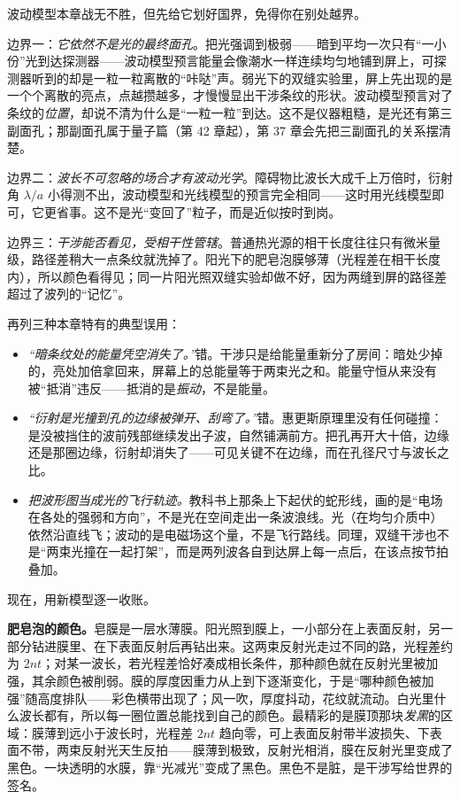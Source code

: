 
\begin{mainline}
波动模型本章战无不胜，但先给它划好国界，免得你在别处越界。

边界一：\emph{它依然不是光的最终面孔}。把光强调到极弱——暗到平均一次只有“一小份”光到达探测器——波动模型预言能量会像潮水一样连续均匀地铺到屏上，可探测器听到的却是一粒一粒离散的“咔哒”声。弱光下的双缝实验里，屏上先出现的是一个个离散的亮点，点越攒越多，才慢慢显出干涉条纹的形状。波动模型预言对了条纹的\emph{位置}，却说不清为什么是“一粒一粒”到达。这不是仪器粗糙，是光还有第三副面孔；那副面孔属于量子篇（第 42 章起），第 37 章会先把三副面孔的关系摆清楚。

边界二：\emph{波长不可忽略的场合才有波动光学}。障碍物比波长大成千上万倍时，衍射角 \(\lambda/a\) 小得测不出，波动模型和光线模型的预言完全相同——这时用光线模型即可，它更省事。这不是光“变回了”粒子，而是近似按时到岗。

边界三：\emph{干涉能否看见，受相干性管辖}。普通热光源的相干长度往往只有微米量级，路径差稍大一点条纹就洗掉了。阳光下的肥皂泡膜够薄（光程差在相干长度内），所以颜色看得见；同一片阳光照双缝实验却做不好，因为两缝到屏的路径差超过了波列的“记忆”。
\end{mainline}

再列三种本章特有的典型误用：

\begin{itemize}[leftmargin=1.8em]
  \item \emph{“暗条纹处的能量凭空消失了。”}错。干涉只是给能量重新分了房间：暗处少掉的，亮处加倍拿回来，屏幕上的总能量等于两束光之和。能量守恒从来没有被“抵消”违反——抵消的是\emph{振动}，不是能量。
  \item \emph{“衍射是光撞到孔的边缘被弹开、刮弯了。”}错。惠更斯原理里没有任何碰撞：是没被挡住的波前残部继续发出子波，自然铺满前方。把孔再开大十倍，边缘还是那圈边缘，衍射却消失了——可见关键不在边缘，而在孔径尺寸与波长之比。
  \item \emph{把波形图当成光的飞行轨迹。}教科书上那条上下起伏的蛇形线，画的是“电场在各处的强弱和方向”，不是光在空间走出一条波浪线。光（在均匀介质中）依然沿直线飞；波动的是电磁场这个量，不是飞行路线。同理，双缝干涉也不是“两束光撞在一起打架”，而是两列波各自到达屏上每一点后，在该点按节拍叠加。
\end{itemize}


现在，用新模型逐一收账。

\textbf{肥皂泡的颜色。}皂膜是一层水薄膜。阳光照到膜上，一小部分在上表面反射，另一部分钻进膜里、在下表面反射后再钻出来。这两束反射光走过不同的路，光程差约为 \(2nt\)；对某一波长，若光程差恰好凑成相长条件，那种颜色就在反射光里被加强，其余颜色被削弱。膜的厚度因重力从上到下逐渐变化，于是“哪种颜色被加强”随高度排队——彩色横带出现了；风一吹，厚度抖动，花纹就流动。白光里什么波长都有，所以每一圈位置总能找到自己的颜色。最精彩的是膜顶那块\emph{发黑}的区域：膜薄到远小于波长时，光程差 \(2nt\) 趋向零，可上表面反射带半波损失、下表面不带，两束反射光天生反拍——膜薄到极致，反射光相消，膜在反射光里变成了黑色。一块透明的水膜，靠“光减光”变成了黑色。黑色不是脏，是干涉写给世界的签名。

